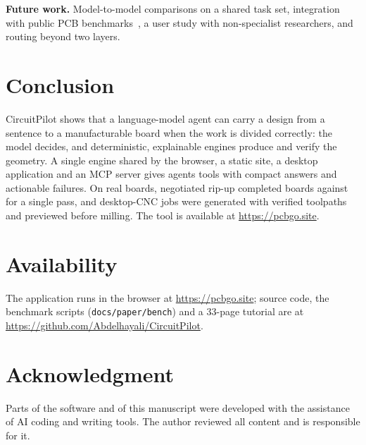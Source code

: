\documentclass[journal]{IEEEtran}
\begin{document}
\textbf{Future work.} Model-to-model comparisons on a shared task set, integration with public PCB benchmarks~\cite{song2026pcbworld,lu2026omnilayout}, a user study with non-specialist researchers, and routing beyond two layers.

\section{Conclusion}
CircuitPilot shows that a language-model agent can carry a design from a sentence to a manufacturable board when the work is divided correctly: the model decides, and deterministic, explainable engines produce and verify the geometry. A single engine shared by the browser, a static site, a desktop application and an MCP server gives agents \ToolCount{} tools with compact answers and actionable failures. On \DesignCount{} real boards, negotiated rip-up completed \FullOk{} boards against \NoRipOk{} for a single pass, and desktop-CNC jobs were generated with verified toolpaths and previewed before milling. The tool is available at \url{https://pcbgo.site}.

\section*{Availability}
The application runs in the browser at \url{https://pcbgo.site}; source code, the benchmark scripts (\texttt{docs/paper/bench}) and a 33-page tutorial are at \url{https://github.com/Abdelhayali/CircuitPilot}.

\section*{Acknowledgment}
Parts of the software and of this manuscript were developed with the assistance of AI coding and writing tools. The author reviewed all content and is responsible for it.

\balance


\end{document}
